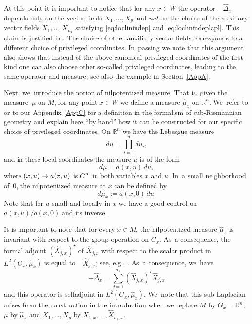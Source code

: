 \documentclass[10pt]{amsart}
\newcommand\mto{\mathchoice{\longmapsto}{\mapsto}{\mapsto}{\mapsto}}
\theoremstyle{definition}
\newcommand{\1}{\mathbbm{1}}
\newcommand{\R}{\mathbb{R}}
\begin{document}
At this point it is important to notice that for any $x\in W$ the operator $-\widehat\Delta_x$ depends only on the vector fields $X_1,\ldots,X_p$ and \emph{not} on the choice of the auxiliary vector fields $\tilde X_1,\ldots,\tilde X_{n_1}$ satisfying \eqref{eq:loclinindep} and \eqref{eq:loclinindeplapl}. This claim is justified in \hbox{\cite[\S A.5.4]{CHT1}}. The choice of other auxiliary vector fields corresponds to a different choice of privileged coordinates. In~passing we note that this argument also shows that instead of the above canonical privileged coordinates of the first kind one can also choose other so-called privileged coordinates, leading to the same operator and measure; see also the example in Section~\ref{AppA}.

Next, we~introduce the notion of nilpotentized measure. That is, given the measure~$\mu$ on $M$, for any point $x\in W$ we define a measure $\widehat \mu_x$ on $\R^n$. We~refer to \cite[App.\,A.5.6]{CHT1} or to our Appendix \ref{AppC} for a definition in the formalism of sub-Riemannian geometry and explain here ``by hand'' how it can be constructed for our specific choice of privileged coordinates.
On $\mathbb R^n$ we have the Lebesgue measure
\[
du= \prod_{i=1}^n du_{i},
\]
and in these local coordinates the measure $\mu$ is of the form
\[
d\mu = a(x,u) \,du,
\]
where $(x,u)\mto a(x,u)$ is $C^\infty$ in both variables $x$ and $u$. In~a small neighborhood of~$0$, the nilpotentized measure at $x$ can be defined by
\begin{equation}\label{eq:nilpmeas}
d\widehat \mu_x:= a(x,0) \,du.
\end{equation}
Note that for $u$ small and locally in $x$ we have a good control on $a(x,u)/a(x,0)$ and its inverse.

It is important to note that for every $x\in M$, the nilpotentized measure $\widehat\mu_x$ is invariant with respect to the group operation on $G_x$. As~a consequence, the formal adjoint $(\widehat X_{j,x})^\star$ of $\widehat X_{j,x}$ with respect to the scalar product in $L^2(G_x,\widehat\mu_x)$ is equal to $-\widehat X_{j,x}$; see, e.g., \cite[Rem.\,A.5]{CHT1}. As~a consequence, we~have
\[
-\widehat \Delta_x = \sum_{j=1}^{n_1} (\widehat X_{j,x})^\star \widehat X_{j,x}
\]
and this operator is selfadjoint in $L^2(G_x,\widehat\mu_x)$. We~note that this sub-Laplacian arises from the construction in the introduction when we replace $M$ by $G_x=\R^n$, $\mu$ by $\widehat\mu_x$ and $X_1,\ldots,X_p$ by $\widehat X_{1,x},\ldots,\widehat X_{n_1,x}$.
\end{document}
